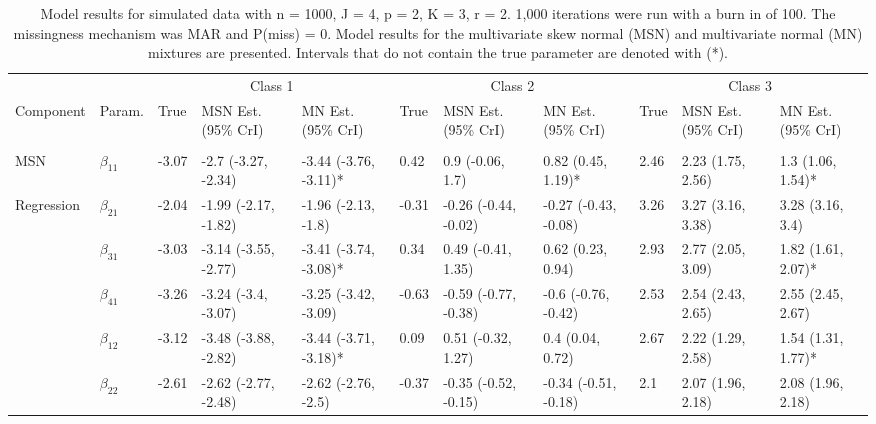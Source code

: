 \documentclass{article}
\begin{document}
\begin{landscape}\begin{table}[t]

\caption{\label{tab:unnamed-chunk-5}Model results for simulated data with n = 1000, J = 4, p = 2, K = 3, r = 2. 1,000 iterations were run with a burn in of 100. The missingness mechanism was MAR and P(miss) = 0. Model results for the multivariate skew normal (MSN) and multivariate normal (MN) mixtures are presented. Intervals that do not contain the true parameter are denoted with (*).}
\centering
\fontsize{6}{8}\selectfont
\begin{tabular}{lllllllllll}
\toprule
\multicolumn{2}{c}{ } & \multicolumn{3}{c}{Class 1} & \multicolumn{3}{c}{Class 2} & \multicolumn{3}{c}{Class 3} \\
\cmidrule(l{3pt}r{3pt}){3-5} \cmidrule(l{3pt}r{3pt}){6-8} \cmidrule(l{3pt}r{3pt}){9-11}
Component & Param. & True & MSN Est. (95\% CrI) & MN Est. (95\% CrI)  & True & MSN Est. (95\% CrI) & MN Est. (95\% CrI) & True & MSN Est. (95\% CrI) & MN Est. (95\% CrI)\\
\midrule
\addlinespace[0.3em]
\multicolumn{11}{l}{\textbf{ }}\\
\hspace{1em}MSN & $\beta_{11}$ & -3.07 & -2.7 (-3.27, -2.34) & -3.44 (-3.76, -3.11)* & 0.42 & 0.9 (-0.06, 1.7) & 0.82 (0.45, 1.19)* & 2.46 & 2.23 (1.75, 2.56) & 1.3 (1.06, 1.54)*\\
\hspace{1em}Regression & $\beta_{21}$ & -2.04 & -1.99 (-2.17, -1.82) & -1.96 (-2.13, -1.8) & -0.31 & -0.26 (-0.44, -0.02) & -0.27 (-0.43, -0.08) & 3.26 & 3.27 (3.16, 3.38) & 3.28 (3.16, 3.4)\\
\hspace{1em} & $\beta_{31}$ & -3.03 & -3.14 (-3.55, -2.77) & -3.41 (-3.74, -3.08)* & 0.34 & 0.49 (-0.41, 1.35) & 0.62 (0.23, 0.94) & 2.93 & 2.77 (2.05, 3.09) & 1.82 (1.61, 2.07)*\\
\hspace{1em} & $\beta_{41}$ & -3.26 & -3.24 (-3.4, -3.07) & -3.25 (-3.42, -3.09) & -0.63 & -0.59 (-0.77, -0.38) & -0.6 (-0.76, -0.42) & 2.53 & 2.54 (2.43, 2.65) & 2.55 (2.45, 2.67)\\
\hspace{1em} & $\beta_{12}$ & -3.12 & -3.48 (-3.88, -2.82) & -3.44 (-3.71, -3.18)* & 0.09 & 0.51 (-0.32, 1.27) & 0.4 (0.04, 0.72) & 2.67 & 2.22 (1.29, 2.58) & 1.54 (1.31, 1.77)*\\
\hspace{1em} & $\beta_{22}$ & -2.61 & -2.62 (-2.77, -2.48) & -2.62 (-2.76, -2.5) & -0.37 & -0.35 (-0.52, -0.15) & -0.34 (-0.51, -0.18) & 2.1 & 2.07 (1.96, 2.18) & 2.08 (1.96, 2.18)\\

\end{tabular}
\end{table}
\end{landscape}
\end{document}
